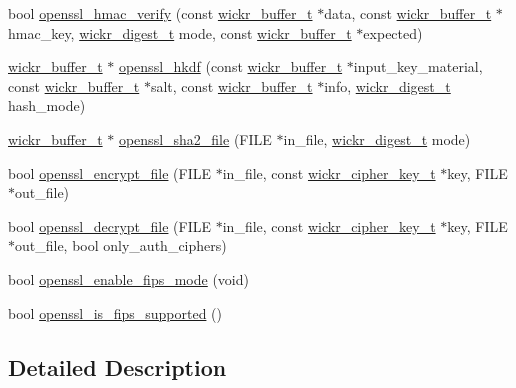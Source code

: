 \begin{DoxyCompactItemize}
bool \mbox{\hyperlink{group__openssl__crypto_gafbde176ef6f2b99ff9dab58ad69a9a74}{openssl\+\_\+hmac\+\_\+verify}} (const \mbox{\hyperlink{structwickr__buffer}{wickr\+\_\+buffer\+\_\+t}} $\ast$data, const \mbox{\hyperlink{structwickr__buffer}{wickr\+\_\+buffer\+\_\+t}} $\ast$hmac\+\_\+key, \mbox{\hyperlink{structwickr__digest}{wickr\+\_\+digest\+\_\+t}} mode, const \mbox{\hyperlink{structwickr__buffer}{wickr\+\_\+buffer\+\_\+t}} $\ast$expected)
\item 
\mbox{\hyperlink{structwickr__buffer}{wickr\+\_\+buffer\+\_\+t}} $\ast$ \mbox{\hyperlink{group__openssl__crypto_ga788a03002d8c6048401cf0bbc2d48c7a}{openssl\+\_\+hkdf}} (const \mbox{\hyperlink{structwickr__buffer}{wickr\+\_\+buffer\+\_\+t}} $\ast$input\+\_\+key\+\_\+material, const \mbox{\hyperlink{structwickr__buffer}{wickr\+\_\+buffer\+\_\+t}} $\ast$salt, const \mbox{\hyperlink{structwickr__buffer}{wickr\+\_\+buffer\+\_\+t}} $\ast$info, \mbox{\hyperlink{structwickr__digest}{wickr\+\_\+digest\+\_\+t}} hash\+\_\+mode)
\item 
\mbox{\hyperlink{structwickr__buffer}{wickr\+\_\+buffer\+\_\+t}} $\ast$ \mbox{\hyperlink{group__openssl__crypto_ga12da75115315fbf7394f4791a2eb815c}{openssl\+\_\+sha2\+\_\+file}} (F\+I\+LE $\ast$in\+\_\+file, \mbox{\hyperlink{structwickr__digest}{wickr\+\_\+digest\+\_\+t}} mode)
\item 
bool \mbox{\hyperlink{group__openssl__crypto_ga178fa1f33ad2767c27411c3ebcdd3ca0}{openssl\+\_\+encrypt\+\_\+file}} (F\+I\+LE $\ast$in\+\_\+file, const \mbox{\hyperlink{structwickr__cipher__key}{wickr\+\_\+cipher\+\_\+key\+\_\+t}} $\ast$key, F\+I\+LE $\ast$out\+\_\+file)
\item 
bool \mbox{\hyperlink{group__openssl__crypto_gaf1faa509e06c188acfbdf43e2197c61a}{openssl\+\_\+decrypt\+\_\+file}} (F\+I\+LE $\ast$in\+\_\+file, const \mbox{\hyperlink{structwickr__cipher__key}{wickr\+\_\+cipher\+\_\+key\+\_\+t}} $\ast$key, F\+I\+LE $\ast$out\+\_\+file, bool only\+\_\+auth\+\_\+ciphers)
\item 
bool \mbox{\hyperlink{group__openssl__crypto_ga04773a29991559a4004c23cc4e8badd7}{openssl\+\_\+enable\+\_\+fips\+\_\+mode}} (void)
\item 
bool \mbox{\hyperlink{group__openssl__crypto_gaed92eb2b892df254af6099cd472b027a}{openssl\+\_\+is\+\_\+fips\+\_\+supported}} ()
\end{DoxyCompactItemize}


\subsection{Detailed Description}


